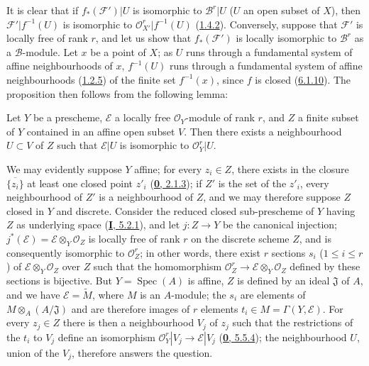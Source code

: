 It is clear that if $f_*(\mathcal{F}')|U$ is isomorphic to
$\mathcal{B}^r|U$ ($U$ an open subset of $X$), then $\mathcal{F}'|f^{-1}(U)$
is isomorphic to $\mathcal{O}_{X'}^r|f^{-1}(U)$
(\hyperref[II.1.4.2]{1.4.2}). Conversely, suppose that $\mathcal{F}'$ is
locally free of rank $r$, and let us show that $f_*(\mathcal{F}')$ is locally
isomorphic to $\mathcal{B}^r$ as a $\mathcal{B}$-module. Let $x$ be a point
of $X$; as $U$ runs through a fundamental system of affine neighbourhoods of
$x$, $f^{-1}(U)$ runs through a fundamental system of affine neighbourhoods
(\hyperref[II.1.2.5]{1.2.5}) of the finite set $f^{-1}(x)$, since $f$ is
closed (\hyperref[II.6.1.10]{6.1.10}). The proposition then follows from
the following lemma:

\begin{lemma}[6.1.12.1]
\label{II.6.1.12.1}
Let $Y$ be a prescheme, $\mathcal{E}$ a locally free $\mathcal{O}_Y$-module
of rank $r$, and $Z$ a finite subset of $Y$ contained in an affine open
subset $V$. Then there exists a neighbourhood $U\subset V$ of $Z$ such that
$\mathcal{E}|U$ is isomorphic to $\mathcal{O}_Y^r|U$.
\end{lemma}

We may evidently suppose $Y$ affine; for every $z_i\in Z$, there exists in
the closure $\overline{\{z_i\}}$ at least one closed point $z'_i$
(\hyperref[0.2.1.3]{\textbf{0}, 2.1.3}); if $Z'$ is the set of the $z'_i$, every
neighbourhood of $Z'$ is a neighbourhood of $Z$, and we may therefore suppose
$Z$ closed in $Y$ and discrete. Consider the reduced closed sub-prescheme of
$Y$ having $Z$ as underlying space (\hyperref[I.5.2.1]{\textbf{I}, 5.2.1}), and let
$j:Z\to Y$ be the canonical injection; $j^*(\mathcal{E})=\mathcal{E}\otimes_Y
\mathcal{O}_Z$ is locally free of rank $r$ on the discrete scheme $Z$, and is
consequently isomorphic to $\mathcal{O}_Z^r$; in other words, there exist $r$
sections $s_i$ ($1\leq i\leq r$) of $\mathcal{E}\otimes_Y\mathcal{O}_Z$
over $Z$ such that the homomorphism
$\mathcal{O}_Z^r\to\mathcal{E}\otimes_Y\mathcal{O}_Z$ defined by these
sections is bijective. But $Y=\operatorname{Spec}(A)$ is affine, $Z$ is
defined by an ideal $\mathfrak{J}$ of $A$, and we have
$\mathcal{E}=\widetilde{M}$, where $M$ is an $A$-module; the $s_i$ are
elements
of $M\otimes_A(A/\mathfrak{J})$ and are therefore images of $r$ elements
$t_i\in M=\Gamma(Y,\mathcal{E})$. For every $z_j\in Z$ there is then a
neighbourhood $V_j$ of $z_j$ such that the restrictions of the $t_i$ to $V_j$
define an isomorphism
$\mathcal{O}_Y^r|V_j\to\mathcal{E}|V_j$
(\hyperref[0.5.5.4]{\textbf{0}, 5.5.4}); the neighbourhood $U$, union of the
$V_j$, therefore answers the question.


